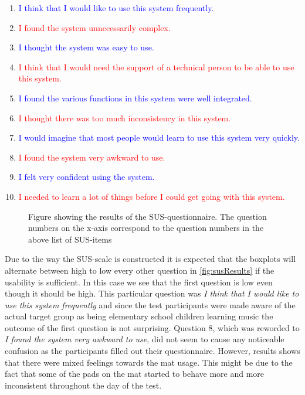 \begin{enumerate}
	\item  \textcolor{blue}{I think that I would like to use this system frequently.}
	\item  \textcolor{red}{I found the system unnecessarily complex.}
	\item  \textcolor{blue}{I thought the system was easy to use.}
	\item  \textcolor{red}{I think that I would need the support of a technical person to be able to use this system.}
	\item  \textcolor{blue}{I found the various functions in this system were well integrated.}
	\item  \textcolor{red}{I thought there was too much inconsistency in this system.}
	\item  \textcolor{blue}{I would imagine that most people would learn to use this system very quickly.}
	\item  \textcolor{red}{I found the system very awkward to use.}
	\item  \textcolor{blue}{I felt very confident using the system.}
	\item  \textcolor{red}{I needed to learn a lot of things before I could get going with this system.}
\end{enumerate} 

\begin{figure}[H]
	\centering
	
	\caption{Figure showing the results of the SUS-questionnaire. The question numbers on the x-axis correspond to the question numbers in the above list of SUS-items}	
	\label{fig:susResults}
\end{figure}

Due to the way the SUS-scale is constructed it is expected that the boxplots will alternate between high to low every other question in \autoref{fig:susResults} if the usability is sufficient. In this case we see that the first question is low even though it should be high. This particular question was \textit{I think that I would like to use this system frequently} and since the test participants were made aware of the actual target group as being elementary school children learning music the outcome of the first question is not surprising. Question 8, which was reworded to \textit{I found the system very awkward to use}, did not seem to cause any noticeable confusion as the participants filled out their questionnaire. However, results shows that there were mixed feelings towards the mat usage. This might be due to the fact that some of the pads on the mat started to behave more and more inconsistent throughout the day of the test.

